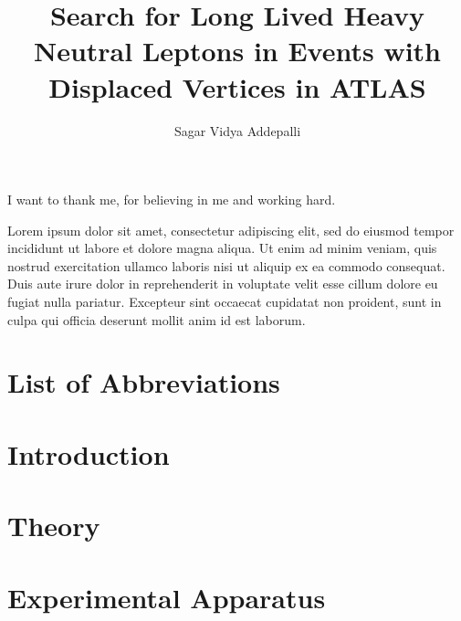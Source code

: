 \documentclass{brandeis-dissertation3.14}
\title{Search for Long Lived Heavy Neutral Leptons in Events with Displaced Vertices in ATLAS }
\author{Sagar Vidya Addepalli}
\begin{document}
\maketitlepage
\makeapproval
\frontmatter

\begin{dissertation-acknowledgements}
I want to thank me, for believing in me and working hard.
\end{dissertation-acknowledgements}

\begin{dissertation-abstract}
Lorem ipsum dolor sit amet, consectetur adipiscing elit, sed do eiusmod tempor incididunt ut labore et dolore magna aliqua. Ut enim ad minim veniam, quis nostrud exercitation ullamco laboris nisi ut aliquip ex ea commodo consequat. Duis aute irure dolor in reprehenderit in voluptate velit esse cillum dolore eu fugiat nulla pariatur. Excepteur sint occaecat cupidatat non proident, sunt in culpa qui officia deserunt mollit anim id est laborum.
\end{dissertation-abstract}

\doublespacing

\tableofcontents{}

\clearpage

\listoftables
{}
\pagebreak
\listoffigures
{}
\pagebreak
\setcounter{secnumdepth}{0}
\chapter*{List of Abbreviations}

\setcounter{secnumdepth}{2}

\startbody

\chapter{Introduction}
\label{chap:intro}


\chapter{Theory}
\label{chap:theory}


\chapter{Experimental Apparatus}
\label{chap:experiment}

\end{document}
